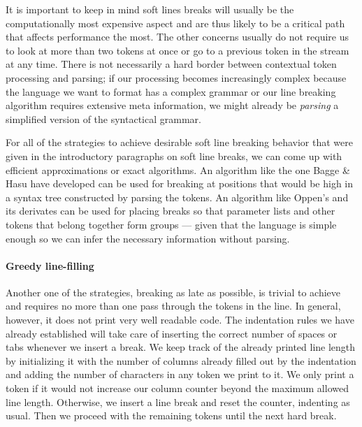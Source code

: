 It is important to keep in mind soft lines breaks will usually be the computationally
most expensive aspect and are thus likely to be a critical path that affects performance the most.
The other concerns usually do not require us to look at more than two tokens at once
or go to a previous token in the stream at any time.
There is not necessarily a hard border between contextual token processing and parsing;
if our processing becomes increasingly complex because the language we want to format
has a complex grammar or our line breaking algorithm requires extensive meta information,
we might already be \textit{parsing} a simplified version of the syntactical grammar.

For all of the strategies to achieve desirable soft line breaking behavior
that were given in the introductory paragraphs on soft line breaks,
we can come up with efficient approximations or exact algorithms.
An algorithm like the one Bagge \& Hasu have developed can be used for breaking at positions
that would be high in a syntax tree constructed by parsing the tokens.
An algorithm like Oppen's \autocite{prettyprinting} and its derivates
can be used for placing breaks so that parameter lists
and other tokens that belong together form groups ---
given that the language is simple enough
so we can infer the necessary information without parsing.

\paragraph{Greedy line-filling}
Another one of the strategies, breaking as late as possible,
is trivial to achieve and requires no more than one pass through the tokens in the line.
In general, however, it does not print very well readable code.
The indentation rules we have already established will take care of inserting
the correct number of spaces or tabs whenever we insert a break.
We keep track of the already printed line length by initializing it with the
number of columns already filled out by the indentation and adding the number
of characters in any token we print to it.
We only print a token if it would not increase our column counter beyond
the maximum allowed line length.
Otherwise, we insert a line break and reset the counter, indenting as usual.
Then we proceed with the remaining tokens until the next hard break.

